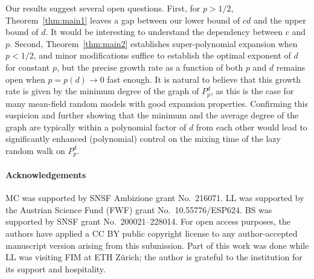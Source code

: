 \documentclass{article}
\theoremstyle{definition}
\begin{document}
Our results suggest several open questions. First, for $p > 1/2$, Theorem~\ref{thm:main1} leaves a gap between our
lower bound of $cd$ and the upper bound of $d$. It would be interesting to understand the dependency between $c$ and $p$. Second, Theorem~\ref{thm:main2} establishes super-polynomial expansion when $p < 1/2$, and minor modifications suffice to establish the optimal exponent of $d$ for constant $p$, but the precise growth rate as a function of both $p$ and $d$ remains open when $p=p(d)\to 0$ fast enough.
It is natural to believe that this growth rate is given by the minimum degree of the graph of $P^d_p$, as this is the case for many mean-field random models with good expansion properties.
Confirming this suspicion and further showing that the minimum and the average degree of the graph are typically within a polynomial factor of $d$ from each other would lead to significantly enhanced (polynomial) control on the mixing time of the lazy random walk on $P^d_p$.


\paragraph{Acknowledgements} MC was supported by SNSF Ambizione grant No.~216071. LL was supported by the Austrian Science Fund (FWF) grant No.~10.55776/ESP624. BS was supported by SNSF grant No.~200021–228014. 
For open access purposes, the authors have applied a CC BY public copyright license to any author-accepted manuscript version arising from this submission.
Part of this work was done while LL was visiting FIM at ETH Z\"urich; the author is grateful to the institution for its support and hospitality.



{\footnotesize{}}
\end{document}
